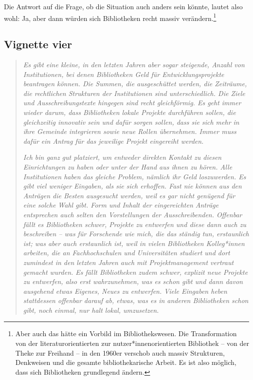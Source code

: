 \documentclass[a4paper,
fontsize=11pt,
oneside,
numbers=noperiodatend,
parskip=half-,
bibliography=totoc,
final
]{scrartcl}
\begin{document}
Die Antwort auf die Frage, ob die Situation auch anders sein könnte,
lautet also wohl: Ja, aber dann würden sich Bibliotheken recht massiv
verändern.\footnote{Aber auch das hätte ein Vorbild im Bibliothekswesen.
  Die Transformation von der literaturorientierten zur
  nutzer*innenorientierten Bibliothek -- von der Theke zur Freihand --
  in den 1960er verschob auch massiv Strukturen, Denkweisen und die
  gesamte bibliothekarische Arbeit. Es ist also möglich, dass sich
  Bibliotheken grundlegend ändern.}

\hypertarget{vignette-vier}{%
\subsection{Vignette vier}\label{vignette-vier}}

\begin{quote}
\emph{Es gibt eine kleine, in den letzten Jahren aber sogar steigende,
Anzahl von Institutionen, bei denen Bibliotheken Geld für
Entwicklungsprojekte beantragen können. Die Summen, die ausgeschüttet
werden, die Zeiträume, die rechtlichen Strukturen der Institutionen sind
unterschiedlich. Die Ziele und Ausschreibungstexte hingegen sind recht
gleichförmig. Es geht immer wieder darum, dass Bibliotheken lokale
Projekte durchführen sollen, die gleichzeitig innovativ sein und dafür
sorgen sollen, dass sie sich mehr in ihre Gemeinde integrieren sowie
neue Rollen übernehmen. Immer muss dafür ein Antrag für das jeweilige
Projekt eingereiht werden.}

\emph{Ich bin ganz gut platziert, um entweder direkten Kontakt zu diesen
Einrichtungen zu haben oder unter der Hand aus ihnen zu hören. Alle
Institutionen haben das gleiche Problem, nämlich ihr Geld loszuwerden.
Es gibt viel weniger Eingaben, als sie sich erhoffen. Fast nie können
aus den Anträgen die Besten ausgesucht werden, weil es gar nicht
genügend für eine solche Wahl gibt. Form und Inhalt der eingereichten
Anträge entsprechen auch selten den Vorstellungen der Ausschreibenden.
Offenbar fällt es Bibliotheken schwer, Projekte zu entwerfen und diese
dann auch zu beschreiben -- was für Forschende wie mich, die das ständig
tun, erstaunlich ist; was aber auch erstaunlich ist, weil in vielen
Bibliotheken Kolleg*innen arbeiten, die an Fachhochschulen und
Universitäten studiert und dort zumindest in den letzten Jahren auch mit
Projektmanagement vertraut gemacht wurden. Es fällt Bibliotheken zudem
schwer, explizit neue Projekte zu entwerfen, also erst wahrzunehmen, was
es schon gibt und dann davon ausgehend etwas Eigenes, Neues zu
entwerfen. Viele Eingaben heben stattdessen offenbar darauf ab, etwas,
was es in anderen Bibliotheken schon gibt, noch einmal, nur halt lokal,
umzusetzen.}


\end{quote}
\end{document}
